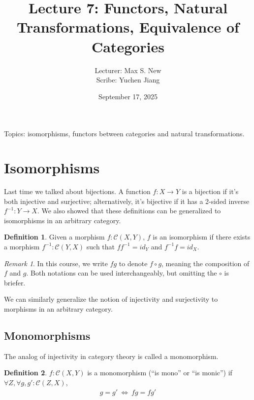 \documentclass[12pt]{article}
\theoremstyle{plain}
\theoremstyle{definition}
\newtheorem{definition}{Definition}
\theoremstyle{remark}
\newtheorem*{remark}{Remark}
\newcommand{\cat}[1]{\mathcal{#1}}
\begin{document}
\title{Lecture 7: Functors, Natural Transformations, Equivalence of Categories}
\author{Lecturer: Max S. New\\ Scribe: Yuchen Jiang}
\date{September 17, 2025}
\maketitle


Topics: isomorphisms, functors between categories and natural transformations.

\section{Isomorphisms}

Last time we talked about bijections. A function $f: X \to Y$ is a bijection if it's both injective and surjective; alternatively, it's bijective if it has a 2-sided inverse $f^{-1}: Y \to X$. We also showed that these definitions can be generalized to isomorphisms in an arbitrary category.

\begin{definition}
  Given a morphism $f: \cat{C}(X, Y)$, $f$ is an isomorphism if there exists a morphism $f^{-1}: \cat{C}(Y, X)$ such that $f f^{-1} = id_Y$ and $f^{-1} f = id_X$.
\end{definition}

\begin{remark}
  In this course, we write $f g$ to denote $f \circ g$, meaning the composition of $f$ and $g$. Both notations can be used interchangeably, but omitting the $\circ$ is briefer.
\end{remark}

We can similarly generalize the notion of injectivity and surjectivity to morphisms in an arbitrary category.

\subsection{Monomorphisms}

The analog of injectivity in category theory is called a monomorphism.

\begin{definition}
  $f : \cat{C}(X, Y)$ is a monomorphism (``is mono'' or ``is monic'') if $\forall Z, \forall g, g' : \cat{C}(Z, X)$,
  \begin{align*}
    g = g'~\iff~f g = f g'
  \end{align*}
\end{definition}
\end{document}
